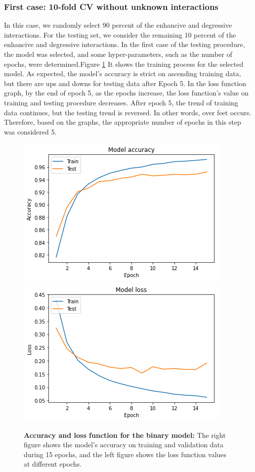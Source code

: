 \documentclass{bmcart}
\begin{document}
\subsubsection*{First case: 10-fold CV without unknown interactions}
In this case, we randomly select 90 percent of the enhancive and degressive interactions. For the testing set, we consider the remaining 10 percent of the enhancive and degressive interactions. In the first case of the testing procedure,  the model was selected, and some hyper-parameters, such as the number of epochs, were determined.Figure
\ref{ModelSelection}
It shows the training process for the selected model. As expected, the model's accuracy is strict on ascending training data, but there are ups and downs for testing data after Epoch 5. In the loss function graph, by the end of epoch 5, as the epochs increase, the loss function's value on training and testing procedure decreases. After epoch 5, the trend of training data continues, but the testing trend is reversed. In other words, over feet occurs. Therefore, based on the graphs, the appropriate number of epochs in this step was considered 5.
\begin{figure}[!h]
	\begin{minipage}{1\linewidth} 
		\includegraphics[width=.48\textwidth]{ModelSelection/selectedModelAcc.png} 
		\includegraphics[width=.48\textwidth]{ModelSelection/selectedModelLoss.png} 
	\end{minipage}
	\caption{\textbf{Accuracy and loss function for the binary model:} The right figure shows the model's accuracy on training and validation data during 15 epochs, and the left figure shows the loss function values at different epochs.}
	\label{ModelSelection}
\end{figure}
\end{document}
